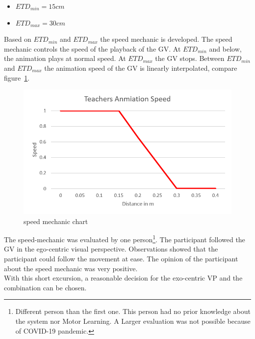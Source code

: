 \begin{itemize}
	\item[] $ETD_{min}=15cm$
	\item[] $ETD_{max}=30cm$
\end{itemize}
Based on $ETD_{min}$ and $ETD_{max}$ the speed mechanic is developed. The speed mechanic controls the speed of the playback of the GV. At $ETD_{min}$ and below, the animation plays at normal speed. At $ETD_{max}$ the GV stops. Between $ETD_{min}$ and $ETD_{max}$ the animation speed of the GV is linearly interpolated, compare figure~\ref{fig:speed_mechanic}.
\begin{figure}[htb]
	\centering
	\includegraphics[width=\textwidth]{figures/speed_mechanic_chart.png}
	\caption[speed mechanic chart]{speed mechanic chart}
	\label{fig:speed_mechanic}
\end{figure}
The speed-mechanic was evaluated by one person\footnote{Different person than the first one. This person had no prior knowledge about the system nor Motor Learning. A Larger evaluation was not possible because of COVID-19 pandemic.}. The participant followed the GV in the ego-centric visual perspective. Observations showed that the participant could follow the movement at ease. The opinion of the participant about the speed mechanic was very positive.\\
With this short excursion, a reasonable decision for the exo-centric VP and the combination can be chosen.\\

